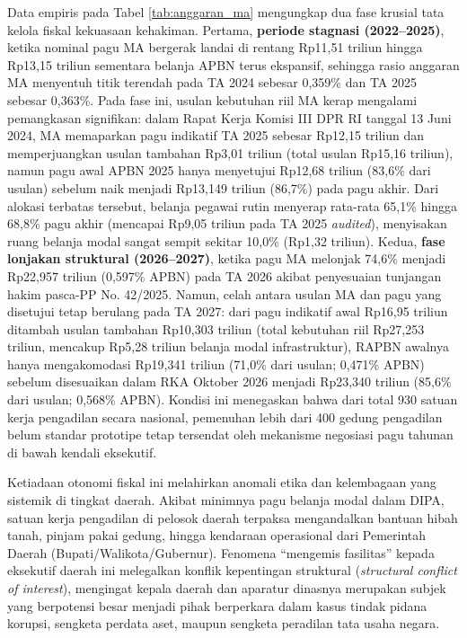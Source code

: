 \documentclass[12pt,a4paper,twocolumn]{article}
\begin{document}
Data empiris pada Tabel \ref{tab:anggaran_ma} mengungkap dua fase krusial tata kelola fiskal kekuasaan kehakiman. Pertama, \textbf{periode stagnasi (2022--2025)}, ketika nominal pagu MA bergerak landai di rentang Rp11,51 triliun hingga Rp13,15 triliun sementara belanja APBN terus ekspansif, sehingga rasio anggaran MA menyentuh titik terendah pada TA 2024 sebesar 0,359\% dan TA 2025 sebesar 0,363\%. Pada fase ini, usulan kebutuhan riil MA kerap mengalami pemangkasan signifikan: dalam Rapat Kerja Komisi III DPR RI tanggal 13 Juni 2024, MA memaparkan pagu indikatif TA 2025 sebesar Rp12,15 triliun dan memperjuangkan usulan tambahan Rp3,01 triliun (total usulan Rp15,16 triliun), namun pagu awal APBN 2025 hanya menyetujui Rp12,68 triliun (83,6\% dari usulan) sebelum naik menjadi Rp13,149 triliun (86,7\%) pada pagu akhir. Dari alokasi terbatas tersebut, belanja pegawai rutin menyerap rata-rata 65,1\% hingga 68,8\% pagu akhir (mencapai Rp9,05 triliun pada TA 2025 \textit{audited}), menyisakan ruang belanja modal sangat sempit sekitar 10,0\% (Rp1,32 triliun). Kedua, \textbf{fase lonjakan struktural (2026--2027)}, ketika pagu MA melonjak 74,6\% menjadi Rp22,957 triliun (0,597\% APBN) pada TA 2026 akibat penyesuaian tunjangan hakim pasca-PP No. 42/2025. Namun, celah antara usulan MA dan pagu yang disetujui tetap berulang pada TA 2027: dari pagu indikatif awal Rp16,95 triliun ditambah usulan tambahan Rp10,303 triliun (total kebutuhan riil Rp27,253 triliun, mencakup Rp5,28 triliun belanja modal infrastruktur), RAPBN awalnya hanya mengakomodasi Rp19,341 triliun (71,0\% dari usulan; 0,471\% APBN) sebelum disesuaikan dalam RKA Oktober 2026 menjadi Rp23,340 triliun (85,6\% dari usulan; 0,568\% APBN). Kondisi ini menegaskan bahwa dari total 930 satuan kerja pengadilan secara nasional, pemenuhan lebih dari 400 gedung pengadilan belum standar prototipe tetap tersendat oleh mekanisme negosiasi pagu tahunan di bawah kendali eksekutif.

Ketiadaan otonomi fiskal ini melahirkan anomali etika dan kelembagaan yang sistemik di tingkat daerah. Akibat minimnya pagu belanja modal dalam DIPA, satuan kerja pengadilan di pelosok daerah terpaksa mengandalkan bantuan hibah tanah, pinjam pakai gedung, hingga kendaraan operasional dari Pemerintah Daerah (Bupati/Walikota/Gubernur). Fenomena ``mengemis fasilitas'' kepada eksekutif daerah ini melegalkan konflik kepentingan struktural (\textit{structural conflict of interest}), mengingat kepala daerah dan aparatur dinasnya merupakan subjek yang berpotensi besar menjadi pihak berperkara dalam kasus tindak pidana korupsi, sengketa perdata aset, maupun sengketa peradilan tata usaha negara.
\end{document}
